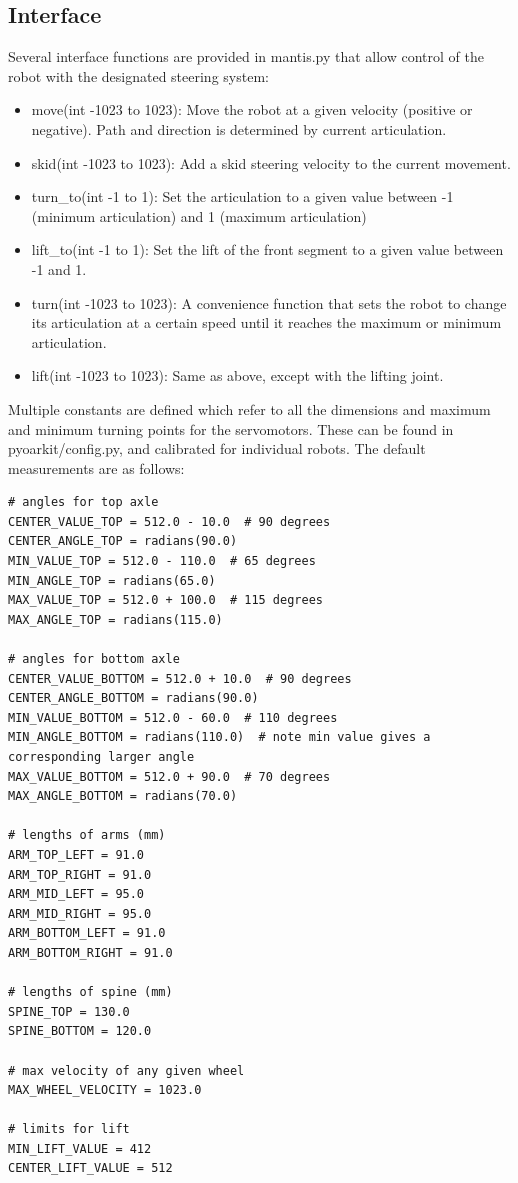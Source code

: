 \documentclass[]{article}
\begin{document}
\subsection{Interface}
Several interface functions are provided in mantis.py that allow control of the robot with the designated steering system:
\begin{itemize}
    \item move(int -1023 to 1023): Move the robot at a given velocity (positive or negative). Path and direction is determined by current articulation.
    \item skid(int -1023 to 1023): Add a skid steering velocity to the current movement.
    \item turn\_to(int -1 to 1): Set the articulation to a given value between -1 (minimum articulation) and 1 (maximum articulation)
    \item lift\_to(int -1 to 1): Set the lift of the front segment to a given value between -1 and 1.
    \item turn(int -1023 to 1023): A convenience function that sets the robot to change its articulation at a certain speed until it reaches the maximum or minimum articulation.
    \item lift(int -1023 to 1023): Same as above, except with the lifting joint.
\end{itemize}

Multiple constants are defined which refer to all the dimensions and maximum and minimum turning points for the servomotors. These can be found in pyoarkit/config.py, and calibrated for individual robots. The default measurements are as follows:
\lstset{language=Python}
\begin{lstlisting}
# angles for top axle
CENTER_VALUE_TOP = 512.0 - 10.0  # 90 degrees
CENTER_ANGLE_TOP = radians(90.0)
MIN_VALUE_TOP = 512.0 - 110.0  # 65 degrees
MIN_ANGLE_TOP = radians(65.0)
MAX_VALUE_TOP = 512.0 + 100.0  # 115 degrees
MAX_ANGLE_TOP = radians(115.0)

# angles for bottom axle
CENTER_VALUE_BOTTOM = 512.0 + 10.0  # 90 degrees
CENTER_ANGLE_BOTTOM = radians(90.0)
MIN_VALUE_BOTTOM = 512.0 - 60.0  # 110 degrees
MIN_ANGLE_BOTTOM = radians(110.0)  # note min value gives a corresponding larger angle
MAX_VALUE_BOTTOM = 512.0 + 90.0  # 70 degrees
MAX_ANGLE_BOTTOM = radians(70.0)

# lengths of arms (mm)
ARM_TOP_LEFT = 91.0
ARM_TOP_RIGHT = 91.0
ARM_MID_LEFT = 95.0
ARM_MID_RIGHT = 95.0
ARM_BOTTOM_LEFT = 91.0
ARM_BOTTOM_RIGHT = 91.0

# lengths of spine (mm)
SPINE_TOP = 130.0
SPINE_BOTTOM = 120.0

# max velocity of any given wheel
MAX_WHEEL_VELOCITY = 1023.0

# limits for lift
MIN_LIFT_VALUE = 412
CENTER_LIFT_VALUE = 512
\end{lstlisting}
\end{document}
